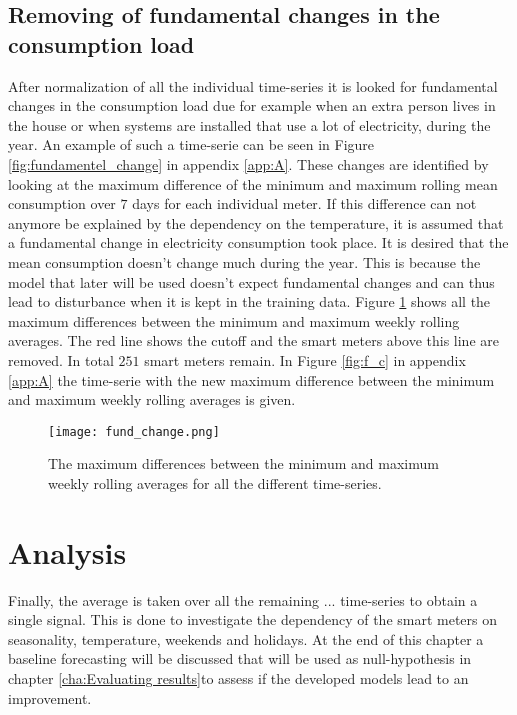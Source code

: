 \subsection{Removing of fundamental changes in the consumption load}  
After normalization of all the individual time-series it is looked for fundamental changes in the consumption load due for example when an extra person lives in the house or when systems are installed that use a lot of electricity, during the year. An example of such a time-serie can be seen in Figure \ref{fig:fundamentel_change} in appendix \ref{app:A}.
These changes are identified by looking at the maximum difference of the minimum and maximum rolling mean consumption over $ 7 $ days for each individual meter. If this difference can not anymore be explained by the dependency on the temperature, it is assumed that a fundamental change in electricity consumption took place. It is desired that the mean consumption doesn't change much during the year. This is because the model that later will be used doesn't expect fundamental changes and can thus lead to disturbance when it is kept in the training data. Figure \ref{fig:fund_change} shows all the maximum differences between the minimum and maximum weekly rolling averages. The red line shows the cutoff and the smart meters above this line are removed. In total $ 251 $ smart meters remain. In Figure \ref{fig:f_c} in appendix \ref{app:A} the time-serie with the new maximum difference between the minimum and maximum weekly rolling averages is given.

\begin{figure}[h!]
	\centering
	\texttt{[image: fund\_change.png]}
	\caption{The maximum differences between the minimum and maximum weekly rolling averages for all the different time-series.}
	\label{fig:fund_change}
\end{figure}




\section{Analysis}\label{s:Analysis}
Finally, the average is taken over all the remaining $...$ time-series to obtain a single signal. This is done to investigate the dependency of the smart meters on seasonality, temperature, weekends and holidays. At the end of this chapter a baseline forecasting will be discussed that will be used as null-hypothesis in chapter \ref{cha:Evaluating results}to assess if the developed models lead to an improvement.

